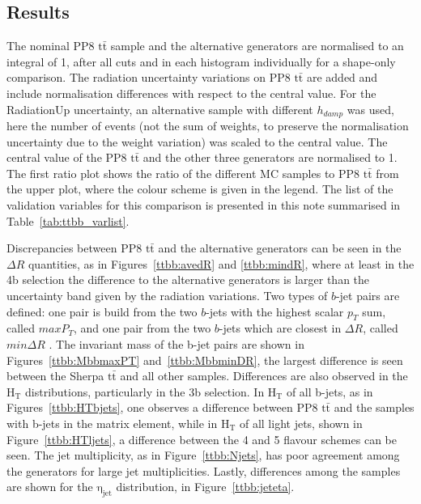\subsection{Results}
The nominal PP8 $\mathrm{t\bar{t}}$ sample and the alternative generators are normalised to an integral of 1, after all cuts and in each histogram individually for a shape-only comparison.
The radiation uncertainty variations on PP8 $\mathrm{t\bar{t}}$ are added and include normalisation differences with respect to the central value. For the RadiationUp uncertainty, an alternative sample with different $h_{damp}$ was used, here the number of events (not the sum of weights, to preserve the normalisation uncertainty due to the weight variation) was scaled to the central value.
The central value of the PP8 $\mathrm{t\bar{t}}$ and the other three generators are normalised to 1. The first ratio plot shows the ratio of the different MC samples to PP8 $\mathrm{t\bar{t}}$ from the upper plot, where the colour scheme is given in the legend.
The list of the validation variables for this comparison is presented in this note summarised in Table~\ref{tab:ttbb_varlist}.

Discrepancies between PP8 $\mathrm{t\bar{t}}$ and the alternative generators can be seen in the $\Delta R$ quantities, as in Figures~\ref{ttbb:avedR} and \ref{ttbb:mindR}, where at least in the 4b selection the difference to the alternative generators is larger than the uncertainty band given by the radiation variations.  
Two types of $b$-jet pairs are defined: one pair is build from the two $b$-jets with the highest scalar $p_T$ sum, called $maxP_T$, and one pair from the two $b$-jets which are closest in $\Delta R$, called $min \Delta R$ . The invariant mass of the b-jet pairs are shown in Figures~\ref{ttbb:MbbmaxPT} and~\ref{ttbb:MbbminDR}, the largest difference is seen between the Sherpa $\mathrm{t\bar{t}}$ and all other samples.
%
Differences are also observed in the $\mathrm{H_T}$ distributions, particularly in the 3b selection. In $\mathrm{H_T}$ of all b-jets, as in Figures~\ref{ttbb:HTbjets}, one observes a difference between PP8 $\mathrm{t\bar{t}}$ and the samples with b-jets in the matrix element, while in $\mathrm{H_T}$ of all light jets, shown in Figure~\ref{ttbb:HTljets}, a difference between the 4 and 5 flavour schemes can be seen. The jet multiplicity, as in Figure~\ref{ttbb:Njets}, has poor agreement among the generators for large jet multiplicities.
Lastly, differences among the samples are shown for the $\mathrm{\eta_{jet}}$ distribution, in Figure~\ref{ttbb:jeteta}.

